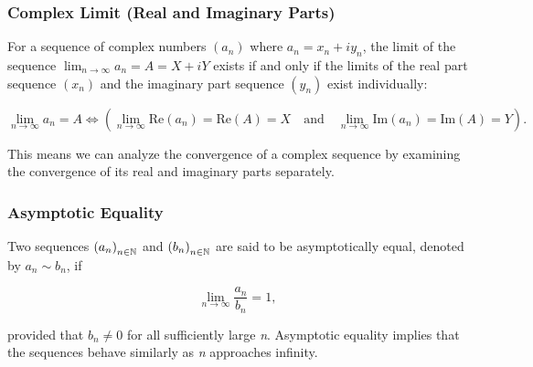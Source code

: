 \subsubsection{Complex Limit (Real and Imaginary Parts)}

For a sequence of complex numbers \((a_n)\) where \(a_n = x_n + i y_n\), the limit of the sequence 
\(\lim_{n \to \infty} a_n = A = X + i Y\) exists if and only if the limits of the real part sequence 
\((x_n)\) and the imaginary part sequence \((y_n)\) exist individually:

\[
    \lim_{n \to \infty} a_n = A \iff \left( \lim_{n \to \infty} \text{Re}(a_n) = \text{Re}(A) = X \quad \text{and} \quad \lim_{n \to \infty} \text{Im}(a_n) = \text{Im}(A) = Y \right).
\]

This means we can analyze the convergence of a complex sequence by examining the convergence of its real 
and imaginary parts separately.

\subsubsection{Asymptotic Equality}

Two sequences \({(a_n)}_{n \in \mathbb{N}}\) and \({(b_n)}_{n \in \mathbb{N}}\) are said to be 
asymptotically equal, denoted by \(a_n \sim b_n\), if

\[
    \lim_{n \to \infty} \frac{a_n}{b_n} = 1,
\]

provided that \(b_n \neq 0\) for all sufficiently large \emph{n}. Asymptotic equality implies that the sequences behave similarly as \emph{n} approaches infinity.

